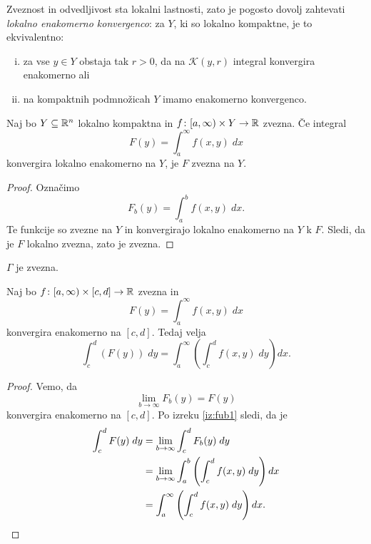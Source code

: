 \begin{opomba}
Zveznost in odvedljivost sta lokalni lastnosti, zato je pogosto
dovolj zahtevati \emph{lokalno enakomerno konvergenco}: za $Y$, ki
so lokalno kompaktne, je to ekvivalentno:

\begin{enumerate}[i)]
\item za vse $y \in Y$ obstaja tak $r > 0$, da na
$\mathcal{K}(y,r)$ integral konvergira enakomerno ali
\item na kompaktnih podmnožicah $Y$ imamo enakomerno konvergenco.
\end{enumerate}
\end{opomba}

\begin{izrek}
Naj bo $Y \subseteq \mathbb{R}^n$ lokalno kompaktna in
$f \colon [a,\infty) \times Y \to \mathbb{R}$ zvezna. Če integral
\[
F(y) = \int_a^\infty f(x,y)\;dx
\]
konvergira lokalno enakomerno na $Y$, je $F$ zvezna na $Y$.
\end{izrek}

\begin{proof}
Označimo
\[
F_b(y) = \int_a^b f(x,y)\;dx.
\]
Te funkcije so zvezne na $Y$ in konvergirajo lokalno enakomerno na
$Y$ k $F$. Sledi, da je $F$ lokalno zvezna, zato je zvezna.
\end{proof}

\begin{posledica}
$\Gamma$ je zvezna.
\end{posledica}

\begin{izrek}[Fubini]
Naj bo $f \colon [a,\infty) \times [c,d] \to \mathbb{R}$ zvezna in
\[
F(y) = \int_a^\infty f(x,y)\;dx
\]
konvergira enakomerno na $[c,d]$. Tedaj velja
\[
\int_c^d \left(F(y)\right)\;dy =
\int_a^\infty \left(\int_c^d f(x,y)\;dy\right) dx.
\]
\end{izrek}

\begin{proof}
Vemo, da
\[
\lim_{b \to \infty} F_b(y) = F(y)
\]
konvergira enakomerno na $[c,d]$. Po izreku \ref{iz:fub1} sledi, da
je
\begin{align*}
\int_c^d F(y)\;dy &=
\lim_{b \to \infty} \int_c^d F_b(y)\;dy
\\
&=
\lim_{b \to \infty} \int_a^b \left(\int_c^d f(x,y)\;dy\right) dx
\\
&=
\int_a^\infty \left(\int_c^d f(x,y)\;dy\right) dx. \qedhere
\end{align*}
\end{proof}

